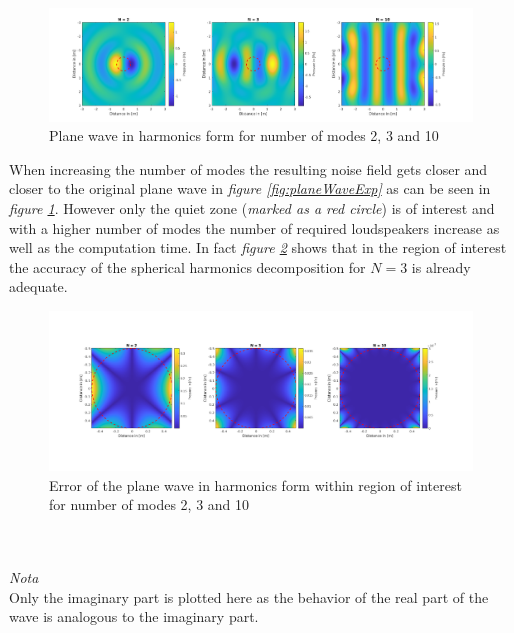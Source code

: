 \begin{figure}[H]
    \centerline{\includegraphics[width=180mm,keepaspectratio]{LaTeX/images/plots/Plane_wave_harmonics_form.png}}
    \caption{Plane wave in harmonics form for number of modes 2, 3 and 10}
    \label{fig:planeWaveHarmonics}
\end{figure}

When increasing the number of modes the resulting noise field gets closer and closer to the original plane wave in \textit{figure \ref{fig:planeWaveExp}} as can be seen in \textit{figure \ref{fig:planeWaveHarmonics}}. However only the quiet zone (\textit{marked as a red circle}) is of interest and with a higher number of modes the number of required loudspeakers increase as well as the computation time. In fact \textit{figure \ref{fig:planeWaveHarmonicsError}} shows that in the region of interest the accuracy of the spherical harmonics decomposition for $N = 3$ is already adequate.
\begin{figure}[H]
    \centerline{\includegraphics[width=180mm,keepaspectratio]{LaTeX/images/plots/Plane_wave_harmonics_form_Error.png}}
    \caption{Error of the plane wave in harmonics form within region of interest for number of modes 2, 3 and 10}
    \label{fig:planeWaveHarmonicsError}
\end{figure}
\\
\\
\textit{Nota}\\
Only the imaginary part is plotted here as the behavior of the real part of the wave is analogous to the imaginary part.
